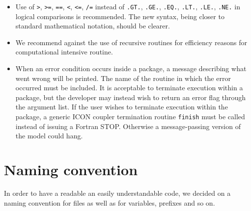 \documentclass[a4paper,11pt,DIV16,BCOR1cm,titlepage]{scrartcl}
\begin{document}
\begin{itemize} 
\item  Use of \texttt{>}, \texttt{>=}, \texttt{==}, \texttt{<}, \texttt{<=},  
\texttt{/=} instead of \texttt{.GT.}, \texttt{.GE.}, \texttt{.EQ.},  
\texttt{.LT.}, \texttt{.LE.}, \texttt{.NE.} in logical comparisons is  
recommended. The new syntax, being closer to standard mathematical  
notation, should be clearer.

\item  
We recommend against the use of recursive routines for efficiency  
reasons for computational intensive routine.

\item When an error condition occurs inside a package, a
  message describing what went wrong will be printed. The name of the
  routine in which the error occurred must be included. It is
  acceptable to terminate execution within a package, but the
  developer may instead wish to return an error flag through the
  argument list.  If the user wishes to terminate execution within the
  package, a generic ICON coupler termination routine \texttt{finish}
  must be called instead of issuing a Fortran STOP. Otherwise a
  message-passing version of the model could hang.

\end{itemize}  

%
\section{Naming convention}\label{sec_gvn}    
%
In order to have a readable an easily understandable code, we decided on a 
naming convention for files as well as for variables, prefixes and so on.
%
\end{document}
